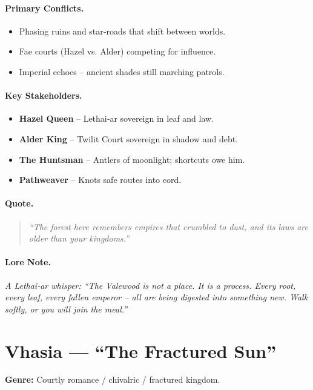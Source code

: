 \paragraph{Primary Conflicts.}
\begin{itemize}
  \item Phasing ruins and star‑roads that shift between worlds.
  \item Fae courts (Hazel vs. Alder) competing for influence.
  \item Imperial echoes – ancient shades still marching patrols.
\end{itemize}

\paragraph{Key Stakeholders.}
\begin{itemize}
  \item \textbf{Hazel Queen} – Lethai‑ar sovereign in leaf and law.
  \item \textbf{Alder King} – Twilit Court sovereign in shadow and debt.
  \item \textbf{The Huntsman} – Antlers of moonlight; shortcuts owe him.
  \item \textbf{Pathweaver} – Knots safe routes into cord.
\end{itemize}

\paragraph{Quote.}
\begin{quote}
\emph{“The forest here remembers empires that crumbled to dust, and its laws are older than your kingdoms.”}
\end{quote}

\paragraph{Lore Note.}
\emph{A Lethai‑ar whisper: “The Valewood is not a place. It is a process. Every root, every leaf, every fallen emperor – all are being digested into something new. Walk softly, or you will join the meal.”}

\section{Vhasia — “The Fractured Sun”}
\textbf{Genre:} Courtly romance / chivalric / fractured kingdom.

